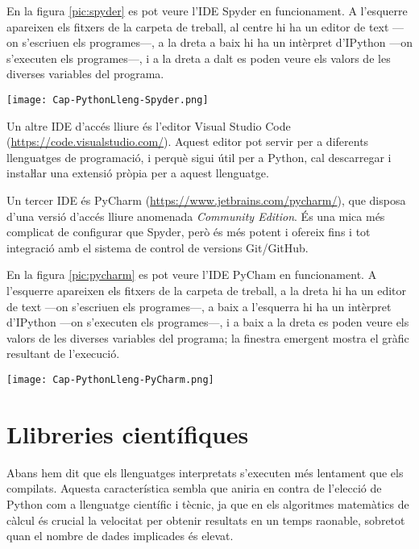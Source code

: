 En la figura \vref{pic:spyder} es pot veure l'IDE Spyder en funcionament. A l'esquerre apareixen els fitxers de la carpeta de treball, al centre hi ha un editor de text ---on s'escriuen els programes---, a la dreta a baix hi ha un intèrpret d'IPython ---on s'executen els programes---, i a la dreta a  dalt es poden veure els valors de les diverses variables del programa.

\begin{center}
	\centering
	\texttt{[image: Cap-PythonLleng-Spyder.png]}
	\label{pic:spyder}
\end{center}

Un altre IDE d'accés lliure és l'editor  Visual Studio Code (\href{https://code.visualstudio.com/}{https://code.visualstudio.com/}). Aquest editor pot servir per a diferents llenguatges de programació, i perquè sigui útil per a Python, cal descarregar i instaŀlar una extensió pròpia per a aquest llenguatge.

Un tercer IDE és PyCharm (\href{https://www.jetbrains.com/pycharm/}{https://www.jetbrains.com/pycharm/}), que disposa d'una versió d'accés lliure anomenada \textit{Community Edition}. És una mica més complicat de configurar que Spyder, però és més potent i ofereix fins i tot integració amb el sistema de control de versions Git/GitHub.

	
En la figura \vref{pic:pycharm} es pot veure l'IDE PyCham en funcionament. A l'esquerre apareixen els fitxers de la carpeta de treball, a la dreta hi ha un editor de text ---on s'escriuen els programes---, a baix a l'esquerra  hi ha un intèrpret d'IPython ---on s'executen els programes---, i a baix a la dreta es poden veure els valors de les diverses variables del programa; la finestra emergent mostra el gràfic resultant de l'execució.

\begin{center}
	\centering
	\texttt{[image: Cap-PythonLleng-PyCharm.png]}
	\label{pic:pycharm}
\end{center}


\section{Llibreries científiques}\label{sec:python-libs}

Abans hem dit que els llenguatges interpretats s'executen més lentament que els compilats. Aquesta característica sembla que aniria en contra de l'elecció de Python com a llenguatge científic i tècnic, ja que en els algoritmes matemàtics de càlcul és crucial la velocitat per obtenir resultats en un temps raonable, sobretot quan el nombre de dades implicades és elevat.

